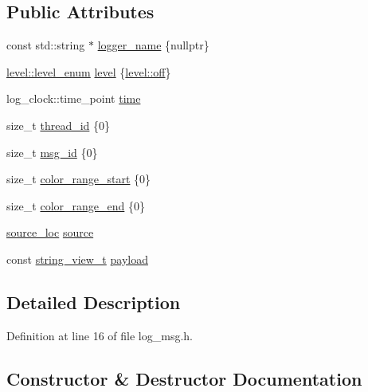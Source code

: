\subsection*{Public Attributes}
\begin{DoxyCompactItemize}
\item 
const std\+::string $\ast$ \hyperlink{structspdlog_1_1details_1_1log__msg_a0aacbf01e2a67660d328fa2080d55def}{logger\+\_\+name} \{nullptr\}
\item 
\hyperlink{namespacespdlog_1_1level_a35f5227e5daf228d28a207b7b2aefc8b}{level\+::level\+\_\+enum} \hyperlink{structspdlog_1_1details_1_1log__msg_a4142f4d66140a1ea24053311ebea5706}{level} \{\hyperlink{namespacespdlog_1_1level_a35f5227e5daf228d28a207b7b2aefc8ba917591d8c0e89f6e6247c95c67809a1a}{level\+::off}\}
\item 
log\+\_\+clock\+::time\+\_\+point \hyperlink{structspdlog_1_1details_1_1log__msg_a25fadb26e6ce94657af5475d4a581313}{time}
\item 
size\+\_\+t \hyperlink{structspdlog_1_1details_1_1log__msg_ab8474cd689276f61021bca37e1993eef}{thread\+\_\+id} \{0\}
\item 
size\+\_\+t \hyperlink{structspdlog_1_1details_1_1log__msg_a8cbec91cdecd3cb4efe9cfa39d5d1d84}{msg\+\_\+id} \{0\}
\item 
size\+\_\+t \hyperlink{structspdlog_1_1details_1_1log__msg_a87cb1c5f1ecd7415412722123e35d491}{color\+\_\+range\+\_\+start} \{0\}
\item 
size\+\_\+t \hyperlink{structspdlog_1_1details_1_1log__msg_a0dfc2763f8e6b73ca34e4cb7c5a9950a}{color\+\_\+range\+\_\+end} \{0\}
\item 
\hyperlink{structspdlog_1_1source__loc}{source\+\_\+loc} \hyperlink{structspdlog_1_1details_1_1log__msg_a607e0014c79c1d39e28b515662ca2ca1}{source}
\item 
const \hyperlink{namespacespdlog_af48e310b2f366ac6544701e6a3b56247}{string\+\_\+view\+\_\+t} \hyperlink{structspdlog_1_1details_1_1log__msg_a33fd07702d73245581fccd8d0d04b82a}{payload}
\end{DoxyCompactItemize}


\subsection{Detailed Description}


Definition at line 16 of file log\+\_\+msg.\+h.



\subsection{Constructor \& Destructor Documentation}
\mbox{\label{structspdlog_1_1details_1_1log__msg_af08273268386a97a4e4a02505f830318}} 

